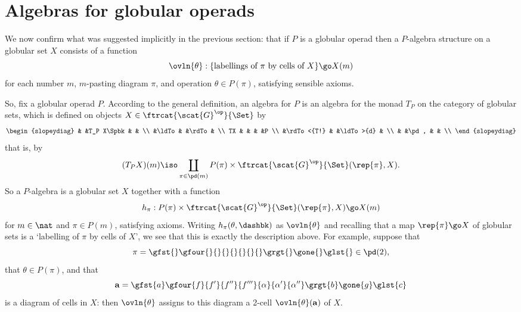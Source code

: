 \section{Algebras for globular operads}
%
%
%
%
%

We now confirm what was suggested implicitly in the previous section: that
if $P$ is a globular operad then a $P$-algebra structure on a globular set
$X$ consists of a function
\[
\ovln{\theta}:
\{ \textrm{labellings of } \pi \textrm{ by cells of } X \}
\go
X(m)
\]%
%
%
%
for each number $m$, $m$-pasting diagram $\pi$, and operation $\theta\in
P(\pi)$, satisfying sensible axioms.

So, fix a globular operad $P$.  According to the general definition, an
algebra for $P$ is an algebra for the monad $T_P$ on the category of
globular sets, which is defined on objects $X \in
\ftrcat{\scat{G}^\op}{\Set}$ by
\[
\begin{slopeydiag}
	&		&T_P X\Spbk	&		&	\\
	&\ldTo		&		&\rdTo		&	\\
TX	&		&		&		&P	\\
	&\rdTo<{T!}	&		&\ldTo>{d}	&	\\
	&		&\pd,		&		&	\\
\end{slopeydiag}
\]
that is, by
\[
(T_P X)(m) \iso
\coprod_{\pi\in\pd(m)}
P(\pi) \times \ftrcat{\scat{G}^\op}{\Set}(\rep{\pi},X).
\]
So a $P$-algebra is a globular set $X$ together with a function
\[
h_\pi: P(\pi) \times \ftrcat{\scat{G}^\op}{\Set}(\rep{\pi},X)
\go
X(m)
\]
for $m\in\nat$ and $\pi\in P(m)$, satisfying axioms.  Writing
$h_\pi(\theta, \dashbk)$ as $\ovln{\theta}$%
% 
% 
and recalling that a map
$\rep{\pi} \go X$ of globular sets is a `labelling of $\pi$ by cells of
$X$', we see that this is exactly the description above.
% 
For example, suppose that 
% 
\begin{equation}	\label{eq:lute}
\pi = 
\gfst{}\gfour{}{}{}{}{}{}{}\grgt{}\gone{}\glst{}
\in \pd(2),
\end{equation}
% 
that $\theta\in P(\pi)$, and that
% 
\begin{equation}	\label{eq:labelled-lute}
\mathbf{a} =
\gfst{a}%
\gfour{f}{f'}{f''}{f'''}{\alpha}{\alpha'}{\alpha''}%
\grgt{b}%
\gone{g}%
\glst{c}
\end{equation}
% 
is a diagram of cells in $X$: then $\ovln{\theta}$ assigns to this diagram a
2-cell $\ovln{\theta}(\mathbf{a})$ of $X$.%
%
%

